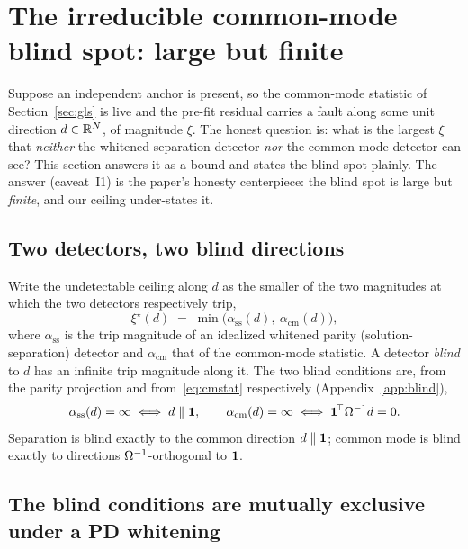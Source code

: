 \section{The irreducible common-mode blind spot: large but finite}
\label{sec:blind}

Suppose an independent anchor is present, so the common-mode statistic of
Section~\ref{sec:gls} is live and the pre-fit residual carries a fault along some
unit direction $d\in\mathbb{R}^N$, of magnitude $\xi$. The honest question is: what is the
largest $\xi$ that \emph{neither} the whitened separation detector \emph{nor} the
common-mode detector can see? This section answers it as a \Proven{} bound and
states the blind spot plainly. The answer (caveat~I1) is the paper's honesty
centerpiece: the blind spot is large but \emph{finite}, and our ceiling
under-states it.

\subsection{Two detectors, two blind directions}
\label{sec:twodetectors}

Write the undetectable ceiling along $d$ as the smaller of the two magnitudes at
which the two detectors respectively trip,
\begin{equation}
  \xi^\star(d) \;=\; \min\big(\alpha_{\mathrm{ss}}(d),\ \alpha_{\mathrm{cm}}(d)\big),
  \label{eq:ceiling}
\end{equation}
where $\alpha_{\mathrm{ss}}$ is the trip magnitude of an idealized whitened parity
(solution-separation) detector and $\alpha_{\mathrm{cm}}$ that of the common-mode
statistic. A detector \emph{blind} to $d$ has an infinite trip magnitude along it.
The two blind conditions are, from the parity projection and
from~\eqref{eq:cmstat} respectively (Appendix~\ref{app:blind}),
\begin{equation}
  \alpha_{\mathrm{ss}}(d)=\infty \iff d \parallel \bm 1{},
  \qquad
  \alpha_{\mathrm{cm}}(d)=\infty \iff \bm 1^{\!\top}\Omega^{-1} d = 0 .
  \label{eq:blindconds}
\end{equation}
Separation is blind exactly to the common direction $d\parallel\bm 1{}$;
common mode is blind exactly to directions $\Omega^{-1}$-orthogonal to $\bm 1{}$.

\subsection{The blind conditions are mutually exclusive under a PD whitening}
\label{sec:mutex}

